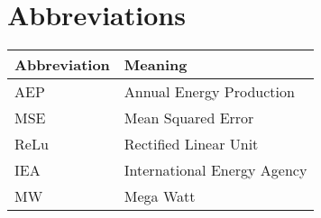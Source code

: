 \chapter*{Abbreviations}
\vspace{-0.5em} %


\renewcommand{\arraystretch}{1.5}
\noindent
\begin{tabular}{@{}ll@{}}
	\textbf{Abbreviation} & \textbf{Meaning} \\
	\hline
	AEP & Annual Energy Production \\
	MSE & Mean Squared Error \\
	ReLu & Rectified Linear Unit \\
	IEA & International Energy Agency \\
	MW  & Mega Watt \\
\end{tabular}
\vspace{-1em} %
\clearpage %
